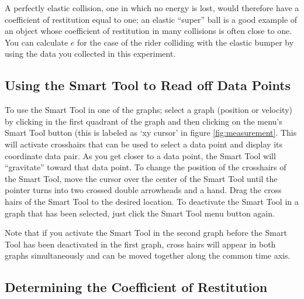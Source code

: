 A perfectly elastic collision, one in which no energy is lost, would therefore have a coefficient of restitution equal to one; an elastic ``super'' ball is a good example of an object whose coefficient of restitution in many collisions is often close to one.  You can calculate $e$ for the case of the rider colliding with the elastic bumper by using the data you collected in this experiment.

\subsection{Using the Smart Tool to Read off Data Points}

To use the Smart Tool in one of the graphs; select a graph (position or velocity) by clicking in the first quadrant of the graph and then clicking on the menu's Smart Tool button (this is labeled as `xy cursor' in figure \ref{fig:measurement}.  This will activate crosshairs that can be used to select a data point and display its coordinate data pair.  As you get closer to a data point, the Smart Tool will ``gravitate'' toward that data point.  To change the position of the crosshairs of the Smart Tool, move the cursor over the center of the Smart Tool until the pointer turns into two crossed double arrowheads and a hand.  Drag the cross hairs of the Smart Tool to the desired location.  To deactivate the Smart Tool in a graph that has been selected, just click the Smart Tool menu button again.  \myskip

Note that if you activate the Smart Tool in the second graph before the Smart Tool has been deactivated in the first graph, cross hairs will appear in both graphs simultaneously and can be moved together along the common time axis.

\subsection{Determining the Coefficient of Restitution}

